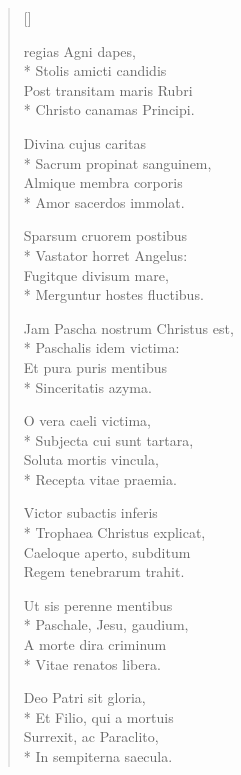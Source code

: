 \newHymn

\begin{verse}[\versewidth]

 regias Agni dapes,\\*
Stolis amicti candidis\\
Post transitam maris Rubri\\*
Christo canamas Principi.\pointtrans

Divina cujus caritas\\*
Sacrum propinat sanguinem,\\
Almique membra corporis\\*
Amor sacerdos immolat.

Sparsum cruorem postibus\\*
Vastator horret Angelus:\\
Fugitque divisum mare,\\*
Merguntur hostes fluctibus.

Jam Pascha nostrum Christus est,\\*
Paschalis idem victima:\\
Et pura puris mentibus\\*
Sinceritatis azyma.

O vera caeli victima,\\*
Subjecta cui sunt tartara,\\
Soluta mortis vincula,\\*
Recepta vitae praemia.

Victor subactis inferis\\*
Trophaea Christus explicat,\\
Caeloque aperto, subditum\\
Regem tenebrarum trahit.

Ut sis perenne mentibus\\*
Paschale, Jesu, gaudium,\\
A morte dira criminum\\*
Vitae renatos libera.


Deo Patri sit gloria,\\*
Et Filio, qui a mortuis\\
Surrexit, ac Paraclito,\\*
In sempiterna saecula.

\end{verse}


